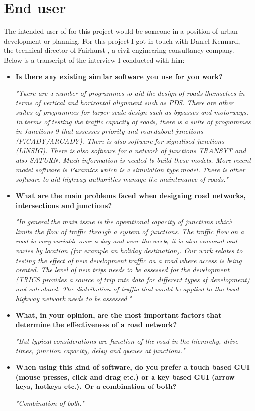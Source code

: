 \section{End user}

    The intended user of for this project would be someone in a position of urban development or planning. For this project I got in touch with Daniel Kennard, the technical director of Fairhurst \cite{fairhurst}, a civil engineering consultancy company. Below is a transcript of the interview I conducted with him:

    \begin{itemize}
        \item \textbf{Is there any existing similar software you use for you work?}

        \emph{"There are a number of programmes to aid the design of roads themselves in terms of vertical and horizontal alignment such as PDS. There are other suites of programmes for larger scale design such as bypasses and motorways. In terms of testing the traffic capacity of roads, there is a suite of programmes in Junctions 9 that assesses priority and roundabout junctions (PICADY/ARCADY). There is also software for signalised junctions (LINSIG). There is also software for a network of junctions TRANSYT and also SATURN. Much information is needed to build these models. More recent model software is Paramics which is a simulation type model. There is other software to aid highway authorities manage the maintenance of roads."}

        \item \textbf{What are the main problems faced when designing road networks, intersections and junctions?}

        \emph{"In general the main issue is the operational capacity of junctions which limits the flow of traffic through a system of junctions. The traffic flow on a road is very variable over a day and over the week, it is also seasonal and varies by location (for example an holiday destination). Our work relates to testing the effect of new development traffic on a road where access is being created. The level of new trips needs to be assessed for the development (TRICS provides a source of trip rate data for different types of development) and calculated. The distribution of traffic that would be applied to the local highway network needs to be assessed."}

        \item \textbf{What, in your opinion, are the most important factors that determine the effectiveness of a road network?}

        \emph{"But typical considerations are function of the road in the hierarchy, drive times, junction capacity, delay and queues at junctions."}

        \item \textbf{When using this kind of software, do you prefer a touch based GUI (mouse presses, click and drag etc.) or a key based GUI (arrow keys, hotkeys etc.). Or a combination of both?}

        \emph{"Combination of both."}
    \end{itemize}

